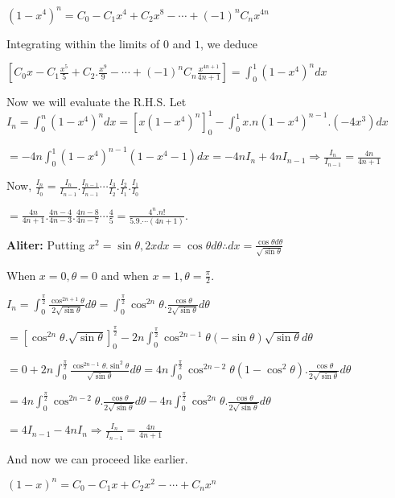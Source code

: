   $(1 - x^4)^n = C_0 - C_1x^4 + C_2x^8 - \cdots + (-1)^nC_nx^{4n}$

  Integrating within the limits of $0$ and $1$, we deduce

  $\left[C_0x - C_1\frac{x^5}{5} + C_2.\frac{x^9}{9} - \cdots + (-1)^nC_n\frac{x^{4n + 1}}{4n + 1}\right] =
  \displaystyle\int_0^1(1 - x^4)^ndx$

  Now we will evaluate the R.H.S. Let $I_n = \displaystyle\int_0^n(1 - x^4)^ndx = [x(1 - x^4)^n]_0^1 -
  \int_0^1x.n(1 - x^4)^{n - 1}.(-4x^3)dx$

  $= -4n\displaystyle\int_0^1(1 - x^4)^{n - 1}(1 - x^4 - 1)dx = -4nI_n + 4nI_{n - 1} \Rightarrow
  \frac{I_n}{I_{n - 1}} = \frac{4n}{4n + 1}$

  Now, $\frac{I_n}{I_0} = \frac{I_n}{I_{n - 1}}.\frac{I_{n - 1}}{I_{n -
      1}}\cdots\frac{I_3}{I_2}.\frac{I_2}{I_1}.\frac{I_1}{I_0}$

  $= \frac{4n}{4n + 1}.\frac{4n - 4}{4n - 3}.\frac{4n - 8}{4n - 7}\cdots \frac{4}{5} =
  \frac{4^n.n!}{5.9.\cdots(4n + 1)}$.

  {\bf Aliter:} Putting $x^2 = \sin\theta, 2xdx = \cos\theta d\theta \therefore dx = \frac{\cos\theta
    d\theta}{\sqrt{\sin\theta}}$

  When $x = 0, \theta = 0$ and when $x = 1, \theta = \frac{\pi}{2}$.

  $I_n = \displaystyle\int_0^{\frac{\pi}{2}}\frac{\cos^{2n + 1}\theta}{2\sqrt{\sin\theta}}d\theta =
  \int_0^{\frac{\pi}{2}}\cos^{2n}\theta.\frac{\cos\theta}{2\sqrt{\sin\theta}}d\theta$

  $= [\cos^{2n}\theta.\sqrt{\sin\theta}]_0^{\frac{\pi}{2}} - 2n\displaystyle\int_0^{\frac{\pi}{2}}\cos^{2n -
    1}\theta(-\sin\theta)\sqrt{\sin\theta}d\theta$

  $= 0 + 2n\displaystyle\int_0^{\frac{\pi}{2}}\frac{\cos^{2n -
      1}\theta.\sin^2\theta}{\sqrt{\sin\theta}}d\theta =
  4n\int_0^{\frac{\pi}{2}}\cos^{2n- 2}\theta(1 - \cos^2\theta).\frac{\cos\theta}{2\sqrt{\sin\theta}}d\theta$

  $= \displaystyle 4n\int_0^{\frac{\pi}{2}}\cos^{2n - 2}\theta.\frac{\cos\theta}{2\sqrt{\sin\theta}}d\theta
  - 4n\int_0^{\frac{\pi}{2}}\cos^{2n}\theta.\frac{\cos\theta}{2\sqrt{\sin\theta}}d\theta$

  $= 4I_{n - 1} - 4nI_n \Rightarrow \frac{I_n}{I_{n - 1}} = \frac{4n}{4n + 1}$

  And now we can proceed like earlier.
\item $(1 - x)^n = C_0 - C_1x + C_2x^2 - \cdots + C_nx^n$

